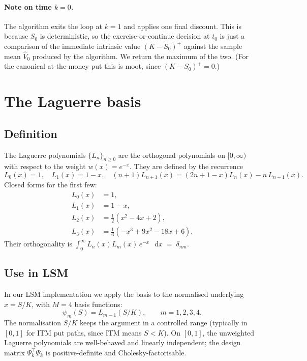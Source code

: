 \documentclass[11pt,a4paper]{article}
\theoremstyle{plain}
\theoremstyle{definition}
\theoremstyle{remark}
\newcommand{\dd}{\mathop{}\!\mathrm{d}}
\begin{document}
\paragraph{Note on time $k = 0$.} The algorithm exits the loop at
$k = 1$ and applies one final discount. This is because $S_0$ is
deterministic, so the exercise-or-continue decision at $t_0$ is just a
comparison of the immediate intrinsic value $(K - S_0)^+$ against the
sample mean $\widehat V_0$ produced by the algorithm. We return the
maximum of the two. (For the canonical at-the-money put this is
moot, since $(K - S_0)^+ = 0$.)

\section{The Laguerre basis}
\label{sec:laguerre}

\subsection{Definition}

The Laguerre polynomials $\{L_n\}_{n \ge 0}$ are the orthogonal
polynomials on $[0, \infty)$ with respect to the weight
$w(x) = e^{-x}$. They are defined by the recurrence
\begin{equation}
L_0(x) = 1, \quad L_1(x) = 1 - x,
\quad
(n + 1) L_{n+1}(x) = (2n + 1 - x) L_n(x) - n\, L_{n-1}(x).
\end{equation}
Closed forms for the first few:
\begin{align}
L_0(x) &= 1, \\
L_1(x) &= 1 - x, \\
L_2(x) &= \tfrac{1}{2}(x^2 - 4x + 2), \\
L_3(x) &= \tfrac{1}{6}(-x^3 + 9x^2 - 18x + 6).
\end{align}
Their orthogonality is
\(
\int_0^\infty L_n(x) L_m(x)\, e^{-x}\,\dd x \;=\; \delta_{nm}.
\)

\subsection{Use in LSM}

In our LSM implementation we apply the basis to the normalised
underlying $x = S/K$, with $M = 4$ basis functions:
\begin{equation}
\psi_m(S) = L_{m-1}(S/K), \qquad m = 1, 2, 3, 4.
\end{equation}
The normalisation $S/K$ keeps the argument in a controlled range
(typically in $[0, 1]$ for ITM put paths, since ITM means $S < K$).
On $[0, 1]$, the unweighted Laguerre polynomials are well-behaved and
linearly independent; the design matrix $\Psi_k^\top \Psi_k$ is
positive-definite and Cholesky-factorisable.
\end{document}
